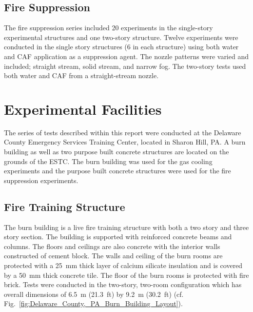 \documentclass[12pt,oneside]{book}
\begin{document}
\subsection{Fire Suppression}
\label{sec:desc_Fire_Suppression}

The fire suppression series included 20 experiments in the single-story experimental structures and one two-story structure. Twelve experiments were conducted in the single story structures (6 in each structure) using both water and CAF application as a suppression agent. The nozzle patterns were varied and included; straight stream, solid stream, and narrow fog.  The two-story tests used both water and CAF from a straight-stream nozzle.

\section{Experimental Facilities}
\label{sec:Experimental_Facility}

The series of tests described within this report were conducted at the Delaware County Emergency Services Training Center, located in Sharon Hill, PA. A burn building as well as two purpose built concrete structures are located on the grounds of the ESTC. The burn building was used for the gas cooling experiments and the purpose built concrete structures were used for the fire suppression experiments.

\subsection{Fire Training Structure}
\label{sec:Burn_Building}

The burn building is a live fire training structure with both a two story and three story section. The building is supported with reinforced concrete beams and columns. The floors and ceilings are also concrete with the interior walls constructed of cement block. The walls and ceiling of the burn rooms are protected with a 25~mm thick layer of calcium silicate insulation and is covered by a 50~mm thick concrete tile. The floor of the burn rooms is protected with fire brick. Tests were conducted in the two-story, two-room configuration which has overall dimensions of 6.5~m (21.3~ft) by 9.2~m (30.2~ft) (cf. Fig.~\ref{fig:Delaware_County,_PA_Burn_Building_Layout}).
\end{document}
